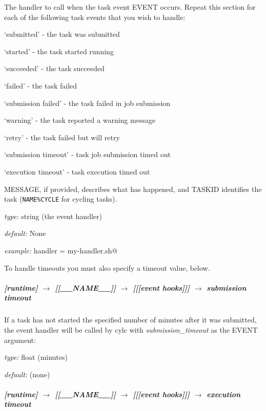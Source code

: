 The handler to call when the task event EVENT occurs. Repeat this
section for each of the following task events that you wish to handle:
\begin{myitemize}
    \item `submitted' - the task was submitted
    \item `started' - the task started running 
    \item `succeeded' - the task succeeded
    \item `failed' - the task failed
    \item `submission failed' - the task failed in job submission
    \item `warning' - the task reported a warning message
    \item `retry' - the task failed but will retry
    \item `submission timeout' - task job submission timed out
    \item `execution timeout' - task execution timed out
\end{myitemize}
MESSAGE, if provided, describes what has happened, and TASKID identifies
the task (\lstinline=NAME%CYCLE= for cycling tasks).

\begin{myitemize}
    \item {\em type:} string (the event handler)
    \item {\em default:} None
    \item {\em example:} \lstinline@failed handler = my-handler.sh@
\end{myitemize}

To handle timeouts you must also specify a timeout value, below.

\subparagraph[submission timeout]{[runtime] $\rightarrow$ [[\_\_NAME\_\_]] $\rightarrow$ [[[event hooks]]] $\rightarrow$ submission timeout}

If a task has not started the specified number of minutes after it was
submitted, the event handler will be called by cylc with 
{\em submission\_timeout} as the EVENT argument:
\begin{myitemize}
    \item {\em type:} float (minutes)
    \item {\em default:} (none)
\end{myitemize}

\subparagraph[execution timeout]{[runtime] $\rightarrow$ [[\_\_NAME\_\_]] $\rightarrow$ [[[event hooks]]] $\rightarrow$ execution timeout}

